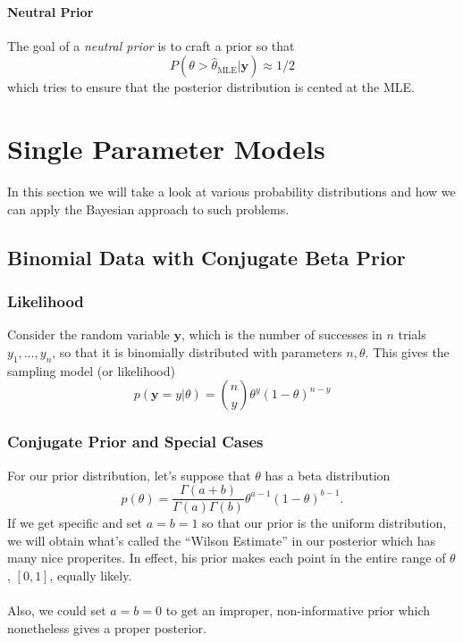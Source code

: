 \documentclass[12pt]{article}
\begin{document}
\paragraph{Neutral Prior} The goal of a \emph{neutral prior} is to
craft a prior so that
   \[ P(\theta > \hat{\theta}_{\text{MLE}} | \mathbf{y}) \approx 1/2 \]
which tries to ensure that the posterior distribution is cented at the 
MLE.




\newpage

\section{Single Parameter Models}

In this section we will take a look at various probability distributions
and how we can apply the Bayesian approach to such problems.


\subsection{Binomial Data with Conjugate Beta Prior}

\subsubsection{Likelihood}

Consider the random variable $\mathbf{y}$, 
which is the number of successes in
$n$ trials $y_1, \ldots, y_n$, so that it is binomially distributed
with parameters $n,\theta$. This gives the sampling model (or 
likelihood)
   \[p(\mathbf{y} = y | \theta) = \binom{n}{y} \theta^y (1-\theta)^{n-y}
      \]

\subsubsection{Conjugate Prior and Special Cases}

For our prior distribution, let's suppose that $\theta$ has a beta
distribution
   \[ p(\theta) = \frac{\Gamma(a + b)}{\Gamma(a)\Gamma(b)}
      \theta^{a-1}(1-\theta)^{b-1}.\]
If we get specific and set $a=b=1$ so that our prior is the uniform
distribution,
we will obtain what's called the ``Wilson Estimate'' in our
posterior which has
many nice properites. In effect, his prior makes each point in the 
entire range of $\theta$, $[0,1]$, equally likely.
\\
\\
Also, we could set $a=b=0$ to get an improper, non-informative prior
which nonetheless gives a proper posterior.
\end{document}
